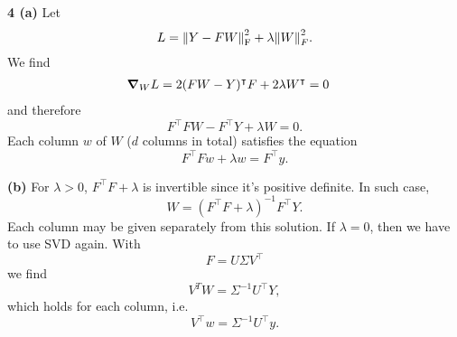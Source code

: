 \documentclass{article}
\makeatletter
\newcommand*{\shifttext}[1]{%
  \settowidth{\@tempdima}{#1}%
  \hspace{-\@tempdima}#1%
}
\newcommand{\plabel}[1]{%
\shifttext{\textbf{#1}\quad}%
}
\newcommand{\prule}{%
\begin{center}%
\hdashrule[0.5ex]{.99\linewidth}{1pt}{1pt 2.5pt}%
\end{center}%
}
\makeatother
\begin{document}
\prule
\plabel{4 (a)}%
Let
\[ L = \norm{Y - FW}^2_{\mathrm{F}} + \lambda \norm{W}^2_F. \]
We find
\begin{align*}
    \grad_W L &= 2(FW - Y)^\intercal F + 2\lambda W^\intercal = 0
\end{align*}
and therefore
\[ F^\intercal F W - F^\intercal Y + \lambda W = 0. \]
Each column $w$ of $W$ ($d$ columns in total) satisfies the equation
\[ F^\intercal F w + \lambda w = F^\intercal y. \]

\plabel{(b)}%
For $\lambda > 0$, $F^\intercal F + \lambda$ is invertible since it's positive definite.
In such case,
\[ W = (F^\intercal F + \lambda)^{-1} F^\intercal Y. \]
Each column may be given separately from this solution.
If $\lambda = 0$, then we have to use SVD again.
With
\[ F = U\Sigma V^\intercal \]
we find
\[ V^T W = \Sigma^{-1}U^\intercal Y, \]
which holds for each column, i.e.
\[ V^\intercal w = \Sigma^{-1} U^\intercal y. \]
\end{document}
